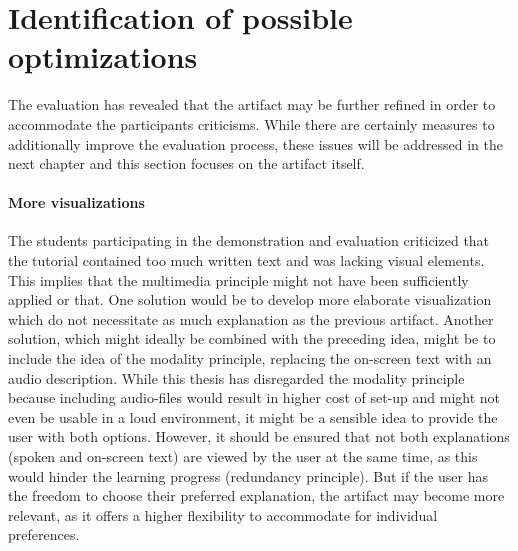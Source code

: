 \section{Identification of possible optimizations} \label{sec:Optimizations}
The evaluation has revealed that the artifact may be further refined in order to accommodate the participants criticisms. While there are certainly measures to additionally improve the evaluation process, these issues will be addressed in the next chapter and this section focuses on the artifact itself.

\paragraph{More visualizations} The students participating in the demonstration and evaluation criticized that the tutorial contained too much written text and was lacking visual elements. This implies that the multimedia principle might not have been sufficiently applied or that. One solution would be to develop more elaborate visualization which do not necessitate as much explanation as the previous artifact. Another solution, which might ideally be combined with the preceding idea, might be to include the idea of the modality principle, replacing the on-screen text with an audio description. While this thesis has disregarded the modality principle because including audio-files would result in higher cost of set-up and might not even be usable in a loud environment, it might be a sensible idea to provide the user with both options. However, it should be ensured that not both explanations (spoken and on-screen text) are viewed by the user at the same time, as this would hinder the learning progress (redundancy principle). But if the user has the freedom to choose their preferred explanation, the artifact may become more relevant, as it offers a higher flexibility to accommodate for individual preferences.

